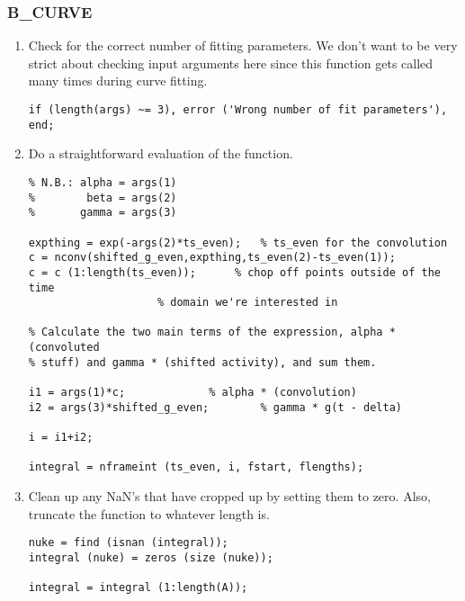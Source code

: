 \subsubsection{B\_CURVE}
\begin{enumerate}

\item Check for the correct number of fitting parameters.  We don't
want to be very strict about checking input arguments here since this
function gets called many times during curve fitting.
\begin{verbatim}
if (length(args) ~= 3), error ('Wrong number of fit parameters'), end;
\end{verbatim}

\item Do a straightforward evaluation of the function.  
\begin{verbatim}
% N.B.: alpha = args(1)
%        beta = args(2)
%       gamma = args(3)

expthing = exp(-args(2)*ts_even); 	% ts_even for the convolution
c = nconv(shifted_g_even,expthing,ts_even(2)-ts_even(1));
c = c (1:length(ts_even));		% chop off points outside of the time
					% domain we're interested in

% Calculate the two main terms of the expression, alpha * (convoluted
% stuff) and gamma * (shifted activity), and sum them.

i1 = args(1)*c;				% alpha * (convolution)
i2 = args(3)*shifted_g_even;		% gamma * g(t - delta)

i = i1+i2;

integral = nframeint (ts_even, i, fstart, flengths);
\end{verbatim}

\item Clean up any NaN's that have cropped up by setting them to zero.
Also, truncate the function to whatever length  is.
\begin{verbatim}
nuke = find (isnan (integral));
integral (nuke) = zeros (size (nuke));

integral = integral (1:length(A));
\end{verbatim}
\end{enumerate}





\newpage
